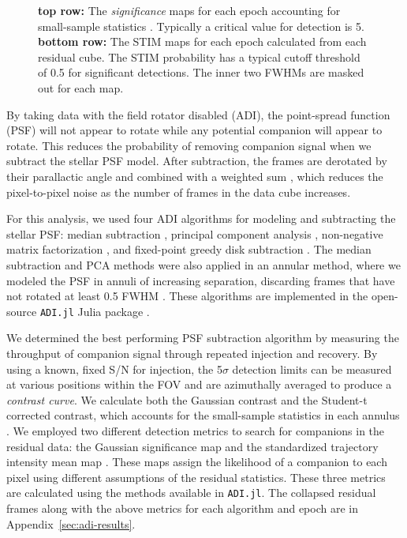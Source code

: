 \documentclass[twocolumn]{aastex631}
\begin{document}
\begin{figure*}
    \centering
    \caption{\textbf{top row:} The \textit{significance} maps for each epoch accounting for small-sample statistics \citep{mawetFundamentalLimitationsHigh2014}. Typically a critical value for detection is 5. \textbf{bottom row:} The STIM maps for each epoch calculated from each residual cube. The STIM probability has a typical cutoff threshold of 0.5 for significant detections. The inner two FWHMs are masked out for each map.}
    \label{fig:detection}
\end{figure*}

By taking data with the field rotator disabled (ADI), the point-spread function (PSF) will not appear to rotate while any potential companion will appear to rotate. This reduces the probability of removing companion signal when we subtract the stellar PSF model. After subtraction, the frames are derotated by their parallactic angle and combined with a weighted sum \citep{bottomNoiseweightedAngularDifferential2017a}, which reduces the pixel-to-pixel noise as the number of frames in the data cube increases.

For this analysis, we used four ADI algorithms for modeling and subtracting the stellar PSF: median subtraction \citep{maroisAngularDifferentialImaging2006}, principal component analysis \citep[PCA, also referred to as KLIP;][]{soummerDetectionCharacterizationExoplanets2012a}, non-negative matrix factorization \citep[NMF;][]{renNonnegativeMatrixFactorization2018a}, and fixed-point greedy disk subtraction \citep[GreeDS;][]{pairetReferencelessAlgorithmCircumstellar2019a,pairetMAYONNAISEMorphologicalComponents2020}. The median subtraction and PCA methods were also applied in an annular method, where we modeled the PSF in annuli of increasing separation, discarding frames that have not rotated at least 0.5 FWHM \citep{maroisAngularDifferentialImaging2006}. These algorithms are implemented in the open-source \texttt{ADI.jl} Julia package \citep{lucasADIJlJulia2020}.

We determined the best performing PSF subtraction algorithm by measuring the throughput of companion signal through repeated injection and recovery. By using a known, fixed S/N for injection, the 5$\sigma$ detection limits can be measured at various positions within the FOV and are azimuthally averaged to produce a \textit{contrast curve}. We calculate both the Gaussian contrast and the Student-t corrected contrast, which accounts for the small-sample statistics in each annulus \citep{mawetFundamentalLimitationsHigh2014}. We employed two different detection metrics to search for companions in the residual data: the Gaussian significance map \citep{mawetFundamentalLimitationsHigh2014} and the standardized trajectory intensity mean map \citep[STIM map;][]{pairetSTIMMapDetection2019}. These maps assign the likelihood of a companion to each pixel using different assumptions of the residual statistics. These three metrics are calculated using the methods available in \texttt{ADI.jl}. The collapsed residual frames along with the above metrics for each algorithm and epoch are in Appendix~\ref{sec:adi-results}.
\end{document}
